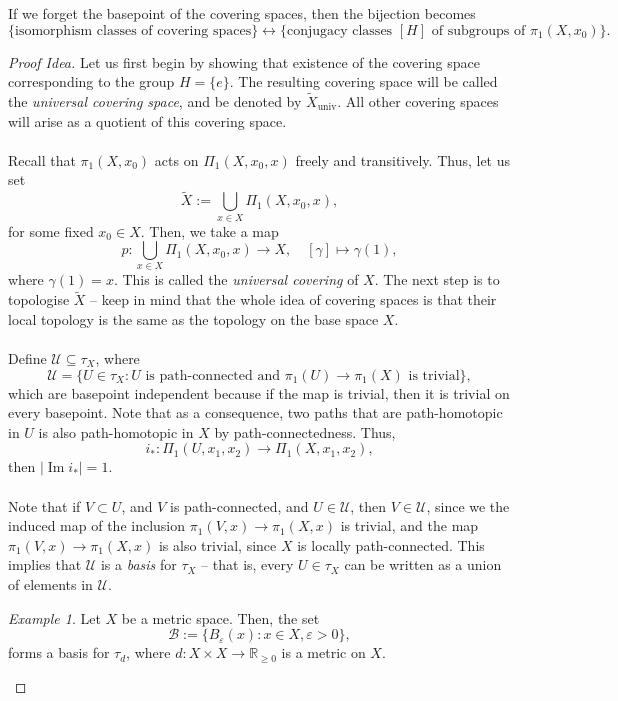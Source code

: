 \documentclass[a4paper]{report}
\theoremstyle{definition}
\theoremstyle{remark}
\theoremstyle{proposition}
\theoremstyle{conjecture}
\theoremstyle{lemma}
\theoremstyle{corollary}
\theoremstyle{exercise}
\newtheorem{example}{Example}
\newcommand{\mcal}{\mathcal}
\newcommand{\on}{\operatorname}
\begin{document}
If we forget the basepoint of the covering spaces, then the bijection becomes 
$$\lbrace \text{isomorphism classes of covering spaces} \rbrace \longleftrightarrow \lbrace \text{conjugacy classes $[H]$ of subgroups of $\pi_1(X,x_0)$}\rbrace.$$
\begin{proof}[Proof Idea]
    Let us first begin by showing that existence of the covering space corresponding to 
    the group $H = \lbrace e\rbrace$. The resulting covering space will be called the \emph{universal covering space},
    and be denoted by $\widetilde{X}_{\on{univ}}$. All other covering spaces will arise as a quotient 
    of this covering space.\\\\ 
    Recall that $\pi_1(X,x_0)$ acts on $\Pi_1(X,x_0,x)$ freely and transitively. 
    Thus, let us set $$\widetilde{X} := \bigcup_{x\in X} \Pi_1(X,x_0,x),$$
    for some fixed $x_0 \in X$. Then, we take a map 
    $$p : \bigcup_{x\in X} \Pi_1(X,x_0,x) \longrightarrow X, \quad [\gamma] \longmapsto \gamma(1),$$
    where $\gamma(1) = x$. This is called the \emph{universal covering} of $X$. The next 
    step is to topologise $\widetilde{X}$ -- keep in mind that the whole idea of covering spaces is that their local 
    topology is the same as the topology on the base space $X$.\\\\ 
    Define $\mcal{U} \subseteq \tau_X$, where 
    $$\mcal{U} = \lbrace U \in \tau_X : \text{$U$ is path-connected and $\pi_1(U) \to \pi_1(X)$ is trivial}\rbrace,$$
    which are basepoint independent because if the map is trivial, then it is trivial 
    on every basepoint. Note that as a consequence, 
    two paths that are path-homotopic in $U$ 
    is also path-homotopic in $X$ by path-connectedness. Thus,
    $$i_\ast : \Pi_1(U,x_1,x_2) \longrightarrow \Pi_1(X,x_1,x_2),$$ 
    then $\vert \on{Im}i_\ast \vert = 1$.\\\\ 
    Note that if $V \subset U$, and $V$ is path-connected, and $U \in \mcal{U}$, then
    $V \in \mcal{U}$, since we the induced map of the inclusion $\pi_1(V,x) \to \pi_1(X,x)$
    is trivial, and the map $\pi_1(V,x) \to \pi_1(X,x)$ is also trivial, since 
    $X$ is locally path-connected. 
    This implies that $\mcal{U}$ is a \emph{basis} for $\tau_X$ -- that is, every 
    $U \in \tau_X$ can be written as a union of elements in $\mcal{U}$.
    
    \begin{example}
        Let $X$ be a metric space. Then, the set 
        $$\mcal{B} := \lbrace B_\varepsilon(x) : x \in X, \varepsilon > 0\rbrace,$$ 
        forms a basis for $\tau_d$, where $d : X \times X \to \mathbb{R}_{\geq 0}$ 
        is a metric on $X$.
    \end{example}
    

\end{proof}
\end{document}
